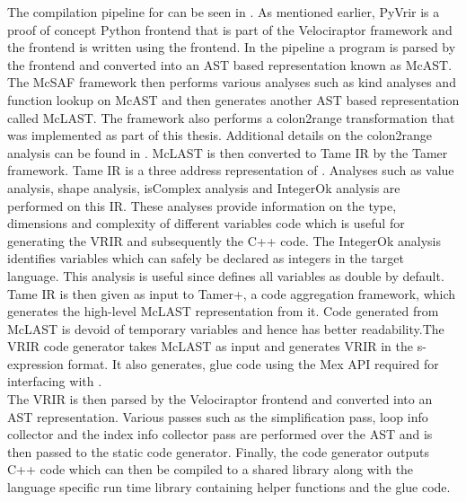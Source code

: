 The compilation pipeline for \velocty can be seen in . As mentioned earlier, PyVrir is a proof of concept Python frontend that is part of the Velociraptor framework and the \matlab frontend is written using the \mclab frontend. In the \mclab pipeline a \matlab program is parsed by the \mclab frontend and converted into an AST based representation known as McAST. The McSAF\cite{doherty11} framework then performs various analyses such as kind analyses and function lookup on McAST and then generates another AST based representation called McLAST. The framework also performs a colon2range transformation that was implemented as part of this thesis. Additional details on the colon2range analysis can be found in . McLAST is then converted to Tame IR\cite{Dubrau:2012} by the Tamer framework. Tame IR is a three address representation of \matlab. Analyses such as value analysis, shape analysis, isComplex analysis and IntegerOk analysis are performed on this IR. These analyses provide information on the type, dimensions and complexity of different variables code which is useful for generating the VRIR and subsequently the C++ code. The IntegerOk analysis identifies variables which can safely be declared as integers in the target language. This analysis is useful since \matlab defines all variables as double by default. Tame IR is then given as input to Tamer+, a code aggregation framework, which generates the high-level McLAST representation from it. Code generated from McLAST is devoid of temporary variables and hence has better readability.The VRIR code generator takes McLAST as input and generates VRIR in the s-expression format. It also generates, glue code using the \matlab Mex\cite{mex} API required for interfacing with \matlab.\\ 
The VRIR is then parsed by the Velociraptor frontend and converted into an AST representation. Various passes such as the simplification pass, loop info collector and the index info collector pass are performed over the AST and is then passed to the static code generator. Finally, the code generator outputs C++ code which can then be compiled to a shared library along with the language specific run time library containing helper functions and the glue code. 
